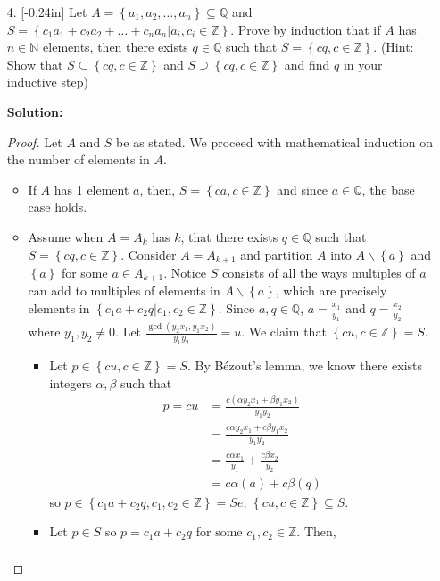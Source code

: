 \documentclass[letterpaper,12pt]{article}
\newcommand{\set}[1]{\left\{ #1 \right\}}
\theoremstyle{definition}
\begin{document}
\pagebreak
\begin{enumerate}
    \item[4.]\reversemarginpar{}[-0.24in] 
  Let $A = \set{a_1,a_2,\ldots,a_n} \subseteq \mathbb{Q}$ and $S = \set{c_1a_1 + c_2a_2 + \ldots + c_n a_n | a_i, c_i  \in \mathbb{Z}}$. Prove by induction that if $A$ has $n \in \mathbb{N}$ elements, then there exists $q \in \mathbb{Q}$ such that $S = \set{cq, c \in \mathbb{Z}}$. (Hint: Show that $S \subseteq \set{cq, c \in \mathbb{Z}}$ and $S \supseteq \set{cq, c \in \mathbb{Z}}$ and find $q$ in your inductive step)
  \begin{mdframed}
  \textbf{Solution:}
      \begin{proof}
          Let $A$ and $S$ be as stated. We proceed with mathematical induction on the number of elements in $A$. \begin{itemize}
        \item If $A$ has 1 element $a$, then, $S = \set{ca, c \in \mathbb{Z}}$ and since $a \in \mathbb{Q}$, the base case holds.
        \item Assume when $A=A_{k}$ has $k$, that there exists $q \in \mathbb{Q}$ such that $S = \set{cq, c \in \mathbb{Z}}$. Consider $A=A_{k+1}$ and partition $A$ into $A\backslash \set{a}$ and $\set{a}$ for some $a \in A_{k+1}$. Notice $S$ consists of all the ways multiples of $a$ can add to multiples of elements in $ A\backslash \set{a}$, which are precisely elements in $\set{c_1 a + c_2 q| c_1,c_2 \in \mathbb{Z}}$. Since $a,q \in \mathbb{Q}$, $a = \frac{x_1}{y_1}$ and $q = \frac{x_2}{y_2}$ where $y_1,y_2 \neq 0$. Let $\frac{\gcd (y_2x_1,y_1x_2)}{y_1y_2} = u$. We claim that $\set{ cu, c \in \mathbb{Z} } = S$. \begin{itemize}
            \item Let $p \in \set{ cu, c \in \mathbb{Z} } = S$. By Bézout's lemma, we know there exists integers $\alpha,\beta$ such that \begin{align*}
                p = cu &= \frac{c( \alpha y_2x_1 + \beta y_1x_2)}{y_1y_2} \\
                &= \frac{c\alpha y_2x_1 + c\beta y_1x_2}{y_1y_2} \\
                &= \frac{c\alpha x_1}{y_1} + \frac{c\beta x_2}{y_2} \\
                &= c\alpha(a) + c\beta(q)
            \end{align*}
            so $p \in \set{c_1 a + c_2 q, c_1,c_2 \in \mathbb{Z}} = Se$, $\set{ cu, c \in \mathbb{Z} } \subseteq S$.
            \item Let $p \in S$ so $p = c_1a + c_2 q$ for some $c_1, c_2 \in \mathbb{Z}$. Then, \begin{align*}

\end{align*}
\end{itemize}
\end{itemize}
\end{proof}
\end{mdframed}
\end{enumerate}
\end{document}
